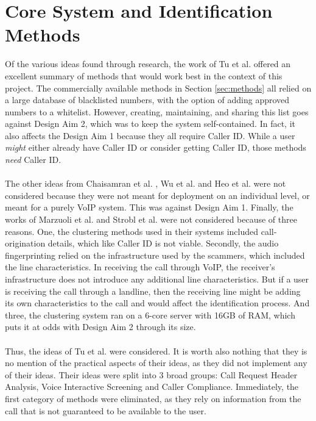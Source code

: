\documentclass[main.tex]{subfiles}
\begin{document}
\section{Core System and Identification Methods}
Of the various ideas found through research, the work of Tu et al. \cite{cisco} offered an excellent summary of methods that would work best in the context of this project. The commercially available methods in Section \ref{sec:methods} all relied on a large database of blacklisted numbers, with the option of adding approved numbers to a whitelist. However, creating, maintaining, and sharing this list goes against Design Aim 2, which was to keep the system self-contained. In fact, it also affects the Design Aim 1 because they all require Caller ID. While a user \textit{might} either already have Caller ID or consider getting Caller ID, those methods \textit{need} Caller ID.
\\\\
The other ideas from Chaisamran et al. \cite{chaisa}, Wu et al. \cite{wu} and Heo et al. \cite{heo} were not considered because they were not meant for deployment on an individual level, or meant for a purely VoIP system. This was against Design Aim 1. Finally, the works of Marzuoli et al. \cite{marzuoli} and Strobl et al. \cite{strobl} were not considered because of three reasons. One, the clustering methods used in their systems included call-origination details, which like Caller ID is not viable. Secondly, the audio fingerprinting relied on the infrastructure used by the scammers, which included the line characteristics. In receiving the call through VoIP, the receiver's infrastructure does not introduce any additional line characteristics. But if a user is receiving the call through a landline, then the receiving line might be adding its own characteristics to the call and would affect the identification process. And three, the clustering system ran on a 6-core server with 16GB of RAM, which puts it at odds with Design Aim 2 through its size.
\\\\
Thus, the ideas of Tu et al. \cite{cisco} were considered. It is worth also nothing that they is no mention of the practical aspects of their ideas, as they did not implement any of their ideas. Their ideas were split into 3 broad groups: Call Request Header Analysis, Voice Interactive Screening and Caller Compliance. Immediately, the first category of methods were eliminated, as they rely on information from the call that is not guaranteed to be available to the user.
\end{document}
